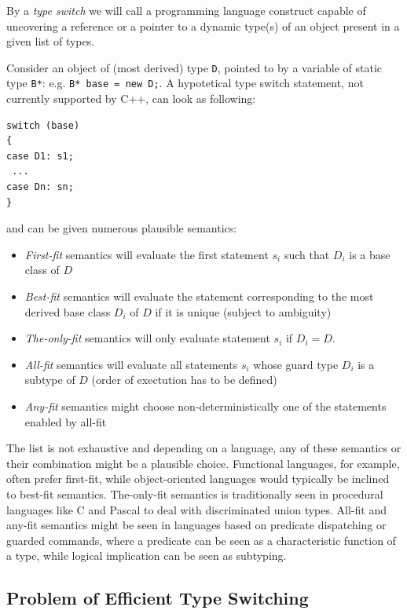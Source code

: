 \documentclass[preprint]{sigplanconf}
\makeatletter
\DeclareRobustCommand{\code}[1]{{\lstinline[breaklines=false,escapechar=@]{#1}}}
\makeatother
\begin{document}
By a \emph{type switch} we will call a programming language construct capable of 
uncovering a reference or a pointer to a dynamic type(s) of an object present in 
a given list of types.

Consider an object of (most derived) type \code{D}, pointed to by a variable of 
static type \code{B*}: e.g. \code{B* base = new D;}. A hypotetical type switch 
statement, not currently supported by C++, can look as following:

\begin{lstlisting}
switch (base)
{
case D1: s1;
 ...
case Dn: sn;
}
\end{lstlisting}

\noindent and can be given numerous plausible semantics:

\begin{itemize}
\setlength{\itemsep}{0pt}
\setlength{\parskip}{0pt}
\item \emph{First-fit} semantics will evaluate the first statement $s_i$ such 
      that $D_i$ is a base class of $D$
\item \emph{Best-fit} semantics will evaluate the statement corresponding to the 
      most derived base class $D_i$ of $D$ if it is unique (subject to 
      ambiguity)
\item \emph{The-only-fit} semantics will only evaluate statement $s_i$ if $D_i=D$.
\item \emph{All-fit} semantics will evaluate all statements $s_i$ whose guard 
      type $D_i$ is a subtype of $D$ (order of exectution has to be defined)
\item \emph{Any-fit} semantics might choose non-deterministically one of the 
      statements enabled by all-fit
\end{itemize}

\noindent
The list is not exhaustive and depending on a language, any of these semantics 
or their combination might be a plausible choice. Functional languages, for 
example, often prefer first-fit, while object-oriented languages would typically 
be inclined to best-fit semantics. The-only-fit semantics is traditionally seen 
in procedural languages like C and Pascal to deal with discriminated union types. 
All-fit and any-fit semantics might be seen in languages based on predicate 
dispatching\cite{ErnstKC98} or guarded commands\cite{EWD:EWD472}, where a 
predicate can be seen as a characteristic function of a type, while logical 
implication can be seen as subtyping.

\subsection{Problem of Efficient Type Switching}
\label{sec:poets}
\end{document}
